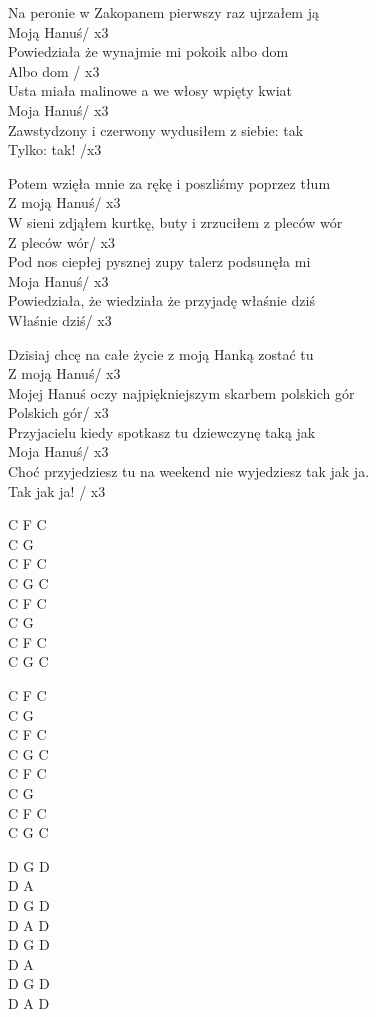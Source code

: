 \begin{text}

    Na peronie w Zakopanem pierwszy raz ujrzałem ją\\
    Moją Hanuś/ x3\\
    Powiedziała że wynajmie mi pokoik albo dom\\
    Albo dom / x3\\
    Usta miała malinowe a we włosy wpięty kwiat\\
    Moja Hanuś/ x3\\
    Zawstydzony i czerwony wydusiłem z siebie: tak\\
    Tylko: tak! /x3

    Potem wzięła mnie za rękę i poszliśmy poprzez tłum\\
    Z moją Hanuś/ x3\\
    W sieni zdjąłem kurtkę, buty i zrzuciłem z pleców wór\\
    Z pleców wór/ x3\\
    Pod nos ciepłej pysznej zupy talerz podsunęła mi\\
    Moja Hanuś/ x3\\
    Powiedziała, że wiedziała że przyjadę właśnie dziś\\
    Właśnie dziś/ x3

    Dzisiaj chcę na całe życie z moją Hanką zostać tu\\
    Z moją Hanuś/ x3\\
    Mojej Hanuś oczy najpiękniejszym skarbem polskich gór\\
    Polskich gór/ x3\\
    Przyjacielu kiedy spotkasz tu dziewczynę taką jak\\
    Moja Hanuś/ x3\\
    Choć przyjedziesz tu na weekend nie wyjedziesz tak jak ja.\\
    Tak jak ja! / x3

\end{text}
\begin{chord}
    C F C\\
    C G\\
    C F C\\
    C G C\\
    C F C\\
    C G\\
    C F C\\
    C G C

    C F C\\
    C G\\
    C F C\\
    C G C\\
    C F C\\
    C G\\
    C F C\\
    C G C

    D G D\\
    D A\\
    D G D\\
    D A D\\
    D G D\\
    D A\\
    D G D\\
    D A D


\end{chord}